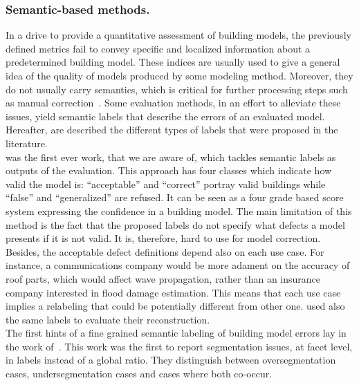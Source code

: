         \subsubsection{Semantic-based methods.}
            \label{subsec::state_of_the_art::quality::output::semantic}
            In a drive to provide a quantitative assessment of building models, the previously defined metrics fail to convey specific and localized information about a predetermined building model.
            These indices are usually used to give a general idea of the quality of models produced by some modeling method.
            Moreover, they do not usually carry semantics, which is critical for further processing steps such as manual correction~\parencite{elberink2011quality}.
            Some evaluation methods, in an effort to alleviate these issues, yield semantic labels that describe the errors of an evaluated model.
            Hereafter, are described the different types of labels that were proposed in the literature.\\

            \parencite{boudet2006supervised} was the first ever work, that we are aware of, which tackles semantic labels as outputs of the evaluation.
            This approach has four classes which indicate how valid the model is: ``acceptable'' and ``correct'' portray valid buildings while ``false'' and ``generalized'' are refused.
            It can be seen as a four grade based score system expressing the confidence in a building model.
            The main limitation of this method is the fact that the proposed labels do not specify what defects a model presents if it is not valid.
            It is, therefore, hard to use for model correction.
            Besides, the acceptable defect definitions depend also on each use case.
            For instance, a communications company would be more adament on the accuracy of roof parts, which would affect wave propagation, rather than an insurance company interested in flood damage estimation.
            This means that each use case implies a relabeling that could be potentially different from other one.
            \textcite{durupt2006automatic} used also the same labels to evaluate their reconstruction.\\
            
            The first hints of a fine grained semantic labeling of building model errors lay in the work of~\textcite{rottensteiner2014results}.
            This work was the first to report segmentation issues, at facet level, in labels instead of a global ratio.
            They distinguish between oversegmentation cases, undersegmentation cases and cases where both co-occur.\\

